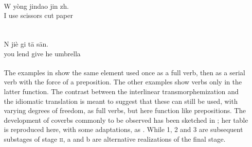 \noindent \ea\label{ex:E88}
\langinfo{\LangMand}{}{}\\
\gll   W  yòng  jindao  jin  zh.\\
 I  use  scissors  cut  paper\\
\\
\z
\noindent \ea\label{ex:E89}
\langinfo{\LangMand}{}{}\\
\gll  N  jiè  gi  t\=a  s\=an.\\
 you  lend  give  he  umbrella\\
\\
\z
\noindent The examples in  show the same element used once as a full verb, then as a serial verb with the force of a preposition. The other examples show verbs only in the latter function. The contrast between the interlinear transmorphemization and the idiomatic translation is meant to suggest that these can still be used, with varying degrees of freedom, as full verbs, but here function like prepositions. The development of coverbs commonly to be observed has been sketched in \citealt[3]{Clark1979}; her table is reproduced here, with some adaptations, as . While 1, 2 and 3 are subsequent substages of stage \textsc{ii}, a and b are alternative realizations of the final stage.

